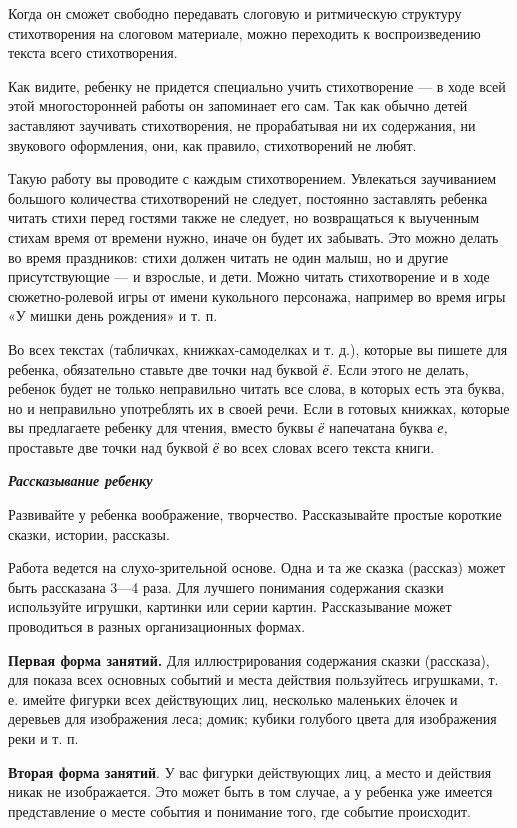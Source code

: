 \documentclass[a5paper]{book}
\renewcommand{\emph}[1]{\textit{#1}}
\begin{document}
Когда он сможет свободно передавать слоговую и ритмическую структуру
стихотворения на слоговом материале, можно переходить к воспроизведению
текста всего стихотворения.

Как видите, ребенку не придется специально учить стихотворение --- в
ходе всей этой многосторонней работы он запоминает его сам. Так как
обычно детей заставляют заучивать стихотворения, не прорабатывая ни их
содержания, ни звукового оформления, они, как правило, стихотворений не
любят.

Такую работу вы проводите с каждым стихотворением. Увлекаться
заучиванием большого количества стихотворений не следует, постоянно
заставлять ребенка читать стихи перед гостями также не следует, но
возвращаться к выученным стихам время от времени нужно, иначе он будет
их забывать. Это можно делать во время праздников: стихи должен читать
не один малыш, но и другие присутствующие --- и взрослые, и дети. Можно
читать стихотворение и в ходе сюжетно-ролевой игры от имени кукольного
персонажа, например во время игры «У мишки день рождения» и т. п.

Во всех текстах (табличках, книжках-самоделках и т. д.), которые вы
пишете для ребенка, обязательно ставьте две точки над буквой \emph{ё.}
Если этого не делать, ребенок будет не только неправильно читать все
слова, в которых есть эта буква, но и неправильно употреблять их в своей
речи. Если в готовых книжках, которые вы предлагаете ребенку для чтения,
вместо буквы \emph{ё} напечатана буква \emph{е,} проставьте две точки
над буквой \emph{ё} во всех словах всего текста книги.

\emph{\textbf{Рассказывание ребенку}}

Развивайте у ребенка воображение, творчество. Рассказывайте простые
короткие сказки, истории, рассказы.

Работа ведется на слухо-зрительной основе. Одна и та же сказка (рассказ)
может быть рассказана 3---4 раза. Для лучшего понимания содержания
сказки используйте игрушки, картинки или серии картин. Рассказывание
может проводиться в разных организационных формах.

\textbf{Первая форма занятий.} Для иллюстрирования содержания сказки
(рассказа), для показа всех основных событий и места действия
пользуйтесь игрушками, т. е. имейте фигурки всех действующих лиц,
несколько маленьких ёлочек и деревьев для изображения леса; домик;
кубики голубого цвета для изображения реки и т. п.

\textbf{Вторая форма занятий}. У вас фигурки действующих лиц, а место и
действия никак не изображается. Это может быть в том случае, а у ребенка
уже имеется представление о месте события и понимание того, где событие
происходит.
\end{document}
